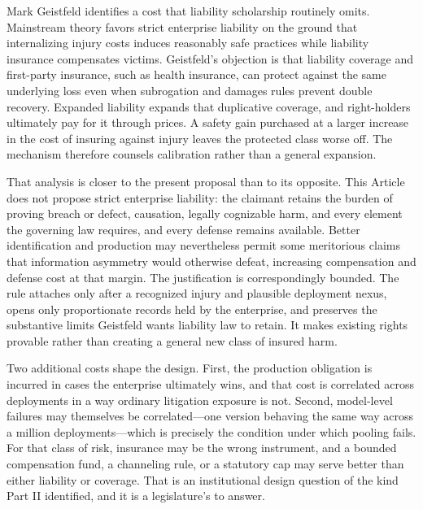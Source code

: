 Mark Geistfeld identifies a cost that liability scholarship routinely omits.
Mainstream theory favors strict enterprise liability on the ground that
internalizing injury costs induces reasonably safe practices while liability
insurance compensates victims. Geistfeld's objection is that liability coverage
and first-party insurance, such as health insurance, can protect against the
same underlying loss even when subrogation and damages rules prevent double
recovery. Expanded liability expands that duplicative coverage, and
right-holders ultimately pay for it through prices. A safety gain purchased at
a larger increase in the cost of insuring against injury leaves the protected
class worse off. The mechanism therefore counsels calibration rather than a
general expansion.

That analysis is closer to the present proposal than to its opposite. This
Article does not propose strict enterprise liability: the claimant retains the
burden of proving breach or defect, causation, legally cognizable harm, and every
element the governing law requires, and every defense remains available. Better
identification and production may nevertheless permit some meritorious claims
that information asymmetry would otherwise defeat, increasing compensation and
defense cost at that margin. The justification is correspondingly bounded. The
rule attaches only after a recognized injury and plausible deployment nexus,
opens only proportionate records held by the enterprise, and preserves the
substantive limits Geistfeld wants liability law to retain. It makes existing
rights provable rather than creating a general new class of insured harm.

Two additional costs shape the design. First, the production
obligation is incurred in cases the enterprise ultimately wins, and that cost is
correlated across deployments in a way ordinary litigation exposure is not.
Second, model-level failures may themselves be correlated---one version behaving
the same way across a million deployments---which is precisely the condition
under which pooling fails. For that class of risk, insurance may be the wrong
instrument, and a bounded compensation fund, a channeling rule, or a statutory
cap may serve better than either liability or coverage. That is an institutional
design question of the kind Part II identified, and it is a legislature's to
answer.


